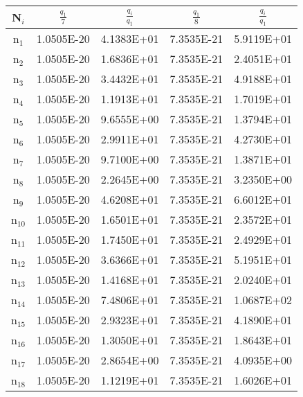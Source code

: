 \documentclass{article}
\begin{document}
\begin{enumerate}
\begin{table}[h!]
    \centering
    \begin{tabular}{|c|c|c|c|c|}
    \hline
       N$_{i}$  & $\frac{q_{1}}{7}$ & $\frac{q_{i}}{q_{1}}$ & $\frac{q_{1}}{8}$ & $\frac{q_{i}}{q_{1}}$\\
       \hline
       n$_{1}$  & 1.0505E-20 & 4.1383E+01 & 7.3535E-21 & 5.9119E+01\\
       \hline
       n$_{2}$  & 1.0505E-20 & 1.6836E+01 & 7.3535E-21 & 2.4051E+01\\
       \hline       
       n$_{3}$  & 1.0505E-20 & 3.4432E+01 & 7.3535E-21 & 4.9188E+01\\
       \hline       
       n$_{4}$  & 1.0505E-20 & 1.1913E+01 & 7.3535E-21 & 1.7019E+01\\
       \hline       
       n$_{5}$  & 1.0505E-20 & 9.6555E+00 & 7.3535E-21 & 1.3794E+01\\
       \hline       
       n$_{6}$  & 1.0505E-20 & 2.9911E+01 & 7.3535E-21 & 4.2730E+01\\
       \hline       
       n$_{7}$  & 1.0505E-20 & 9.7100E+00 & 7.3535E-21 & 1.3871E+01\\
       \hline       
       n$_{8}$  & 1.0505E-20 & 2.2645E+00 & 7.3535E-21 & 3.2350E+00\\
       \hline       
       n$_{9}$  & 1.0505E-20 & 4.6208E+01 & 7.3535E-21 & 6.6012E+01\\
       \hline       
       n$_{10}$  & 1.0505E-20 & 1.6501E+01 & 7.3535E-21 & 2.3572E+01\\
       \hline       
       n$_{11}$  & 1.0505E-20 & 1.7450E+01 & 7.3535E-21 & 2.4929E+01\\
       \hline       
       n$_{12}$  & 1.0505E-20 & 3.6366E+01 & 7.3535E-21 & 5.1951E+01\\
       \hline       
       n$_{13}$  & 1.0505E-20 & 1.4168E+01 & 7.3535E-21 & 2.0240E+01\\
       \hline       
       n$_{14}$  & 1.0505E-20 & 7.4806E+01 & 7.3535E-21 & 1.0687E+02\\
       \hline
       n$_{15}$  & 1.0505E-20 & 2.9323E+01 & 7.3535E-21 & 4.1890E+01\\
       \hline       
       n$_{16}$  & 1.0505E-20 & 1.3050E+01 & 7.3535E-21 & 1.8643E+01\\
       \hline       
       n$_{17}$  & 1.0505E-20 & 2.8654E+00 & 7.3535E-21 & 4.0935E+00\\
       \hline       
       n$_{18}$  & 1.0505E-20 & 1.1219E+01 & 7.3535E-21 & 1.6026E+01\\

\end{tabular}
\end{table}
\end{enumerate}
\end{document}
